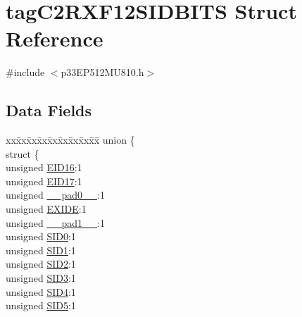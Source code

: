 \hypertarget{structtag_c2_r_x_f12_s_i_d_b_i_t_s}{}\section{tag\+C2\+R\+X\+F12\+S\+I\+D\+B\+I\+TS Struct Reference}
\label{structtag_c2_r_x_f12_s_i_d_b_i_t_s}


{\ttfamily \#include $<$p33\+E\+P512\+M\+U810.\+h$>$}

\subsection*{Data Fields}
\begin{DoxyCompactItemize}
\item 
\begin{tabbing}
xx\=xx\=xx\=xx\=xx\=xx\=xx\=xx\=xx\=\kill
union \{\\
\>struct \{\\
\>\>unsigned \hyperlink{structtag_c2_r_x_f12_s_i_d_b_i_t_s_a6dd5663b0c9838c56db040560ca0efa1}{EID16}:1\\
\>\>unsigned \hyperlink{structtag_c2_r_x_f12_s_i_d_b_i_t_s_aa648615464b0eb29967529333eee9fd9}{EID17}:1\\
\>\>unsigned \hyperlink{structtag_c2_r_x_f12_s_i_d_b_i_t_s_adf71f3d8410c1f1dbbc96680a92c49af}{\_\_pad0\_\_}:1\\
\>\>unsigned \hyperlink{structtag_c2_r_x_f12_s_i_d_b_i_t_s_a09ff1c1be3927220bd3dfbc10edfe243}{EXIDE}:1\\
\>\>unsigned \hyperlink{structtag_c2_r_x_f12_s_i_d_b_i_t_s_acaf2d0924a107ec6e8d2e31febaf66f9}{\_\_pad1\_\_}:1\\
\>\>unsigned \hyperlink{structtag_c2_r_x_f12_s_i_d_b_i_t_s_a1ca276ac15df60e1f7b9a6d0011ade93}{SID0}:1\\
\>\>unsigned \hyperlink{structtag_c2_r_x_f12_s_i_d_b_i_t_s_a3405d354f81391f879648f69f504dfc8}{SID1}:1\\
\>\>unsigned \hyperlink{structtag_c2_r_x_f12_s_i_d_b_i_t_s_ad744966dfc49307f731b7045b01b94e5}{SID2}:1\\
\>\>unsigned \hyperlink{structtag_c2_r_x_f12_s_i_d_b_i_t_s_a9345f3e64720be93e83d8dfc827f3f45}{SID3}:1\\
\>\>unsigned \hyperlink{structtag_c2_r_x_f12_s_i_d_b_i_t_s_aefb106fed4bb40e2c3c71ac612c554e3}{SID4}:1\\
\>\>unsigned \hyperlink{structtag_c2_r_x_f12_s_i_d_b_i_t_s_a0f221b3c9612231686bf87ccdcec8489}{SID5}:1\\

\end{tabbing}
\end{DoxyCompactItemize}
